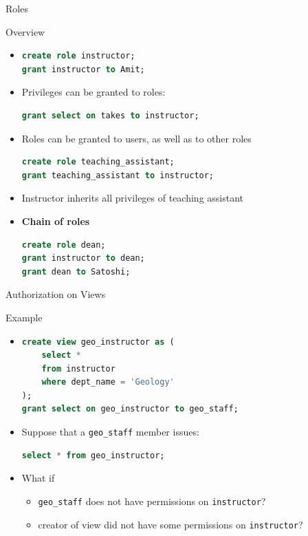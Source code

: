\documentclass[aspectratio=169, xcolor=dvipsnames]{beamer}
\begin{document}
\begin{frame}[fragile]{Roles}
    \begin{block}{Overview}
        \begin{itemize}[<+->]
            \item \begin{lstlisting}[language=SQL]
create role instructor;
grant instructor to Amit;
            \end{lstlisting}
            \item Privileges can be granted to roles:
            \begin{lstlisting}[language=SQL]
grant select on takes to instructor;
            \end{lstlisting}
            \item Roles can be granted to users, as well as to other roles
            \begin{lstlisting}[language=SQL]
create role teaching_assistant;
grant teaching_assistant to instructor;
            \end{lstlisting}
            \item Instructor inherits all privileges of teaching assistant
            \item \textbf{Chain of roles}
            \begin{lstlisting}[language=SQL]
create role dean;
grant instructor to dean;
grant dean to Satoshi;
            \end{lstlisting}
        \end{itemize}
    \end{block}
\end{frame}

\begin{frame}[fragile]{Authorization on Views}
    \begin{exampleblock}{Example}
        \begin{itemize}[<+->]
            \item \begin{lstlisting}[language=SQL]
create view geo_instructor as (
    select * 
    from instructor 
    where dept_name = 'Geology'
);
grant select on geo_instructor to geo_staff;
            \end{lstlisting}
            \item Suppose that a \texttt{geo\_staff} member issues:
            \begin{lstlisting}[language=SQL]
select * from geo_instructor;
            \end{lstlisting}
            \item What if
            \begin{itemize}
                \item[$\triangleright$] \texttt{geo\_staff} does not have permissions on \texttt{instructor}?
                \item[$\triangleright$] creator of view did not have some permissions on \texttt{instructor}?
            \end{itemize}
        \end{itemize}
    \end{exampleblock}
\end{frame}
\end{document}
